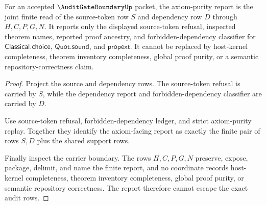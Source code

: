 \begin{theorem}
\label{thm:audit-gate-boundary-axiom-purity-report-nonescape}
For an accepted $\AuditGateBoundaryUp$ packet, the axiom-purity report is the joint finite read of the source-token row $S$ and dependency row $D$ through $H,C,P,G,N$. It reports only the displayed source-token refusal, inspected theorem names, reported proof ancestry, and forbidden-dependency classifier for $\mathsf{Classical.choice}$, $\mathsf{Quot.sound}$, and $\mathsf{propext}$. It cannot be replaced by host-kernel completeness, theorem inventory completeness, global proof purity, or a semantic repository-correctness claim.
\end{theorem}
\begin{proof}
Project the source and dependency rows. The source-token refusal is carried by $S$, while the dependency report and forbidden-dependency classifier are carried by $D$.

Use source-token refusal, forbidden-dependency ledger, and strict axiom-purity replay. Together they identify the axiom-facing report as exactly the finite pair of rows $S,D$ plus the shared support rows.

Finally inspect the carrier boundary. The rows $H,C,P,G,N$ preserve, expose, package, delimit, and name the finite report, and no coordinate records host-kernel completeness, theorem inventory completeness, global proof purity, or semantic repository correctness. The report therefore cannot escape the exact audit rows.
\end{proof}

